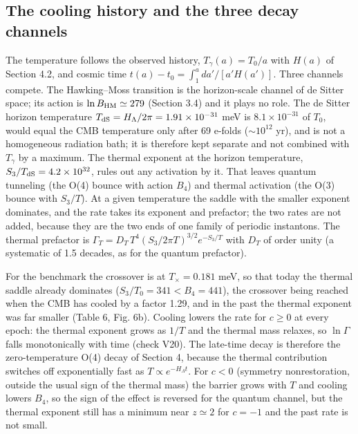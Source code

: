 \documentclass[11pt,a4paper]{article}
\begin{document}
\subsection{The cooling history and the three decay channels}
The temperature follows the observed history, $T_\gamma(a)=T_0/a$ with $H(a)$ of Section 4.2, and cosmic time $t(a)-t_0=\int_1^a da'/[a'H(a')]$. Three channels compete. The Hawking--Moss transition is the horizon-scale channel of de Sitter space; its action is $\ln B_{\rm HM}\simeq279$ (Section 3.4) and it plays no role. The de Sitter horizon temperature $T_{\rm dS}=H_\Lambda/2\pi=1.91\times10^{-31}$ meV is $8.1\times10^{-31}$ of $T_0$, would equal the CMB temperature only after 69 e-folds ($\sim10^{12}$ yr), and is not a homogeneous radiation bath; it is therefore kept separate and not combined with $T_\gamma$ by a maximum. The thermal exponent at the horizon temperature, $S_3/T_{\rm dS}=4.2\times10^{32}$, rules out any activation by it. That leaves quantum tunneling (the O(4) bounce with action $B_4$) and thermal activation (the O(3) bounce with $S_3/T$). At a given temperature the saddle with the smaller exponent dominates, and the rate takes its exponent and prefactor; the two rates are not added, because they are the two ends of one family of periodic instantons. The thermal prefactor is $\Gamma_T=D_T\,T^4(S_3/2\pi T)^{3/2}e^{-S_3/T}$ with $D_T$ of order unity (a systematic of 1.5 decades, as for the quantum prefactor).

For the benchmark the crossover is at $T_\times=0.181$ meV, so that today the thermal saddle already dominates ($S_3/T_0=341<B_4=441$), the crossover being reached when the CMB has cooled by a factor 1.29, and in the past the thermal exponent was far smaller (Table 6, Fig. 6b). Cooling lowers the rate for $c\ge0$ at every epoch: the thermal exponent grows as $1/T$ and the thermal mass relaxes, so $\ln\Gamma$ falls monotonically with time (check V20). The late-time decay is therefore the zero-temperature O(4) decay of Section 4, because the thermal contribution switches off exponentially fast as $T\propto e^{-H_\Lambda t}$. For $c<0$ (symmetry nonrestoration, outside the usual sign of the thermal mass) the barrier grows with $T$ and cooling lowers $B_4$, so the sign of the effect is reversed for the quantum channel, but the thermal exponent still has a minimum near $z\simeq2$ for $c=-1$ and the past rate is not small.
\end{document}
